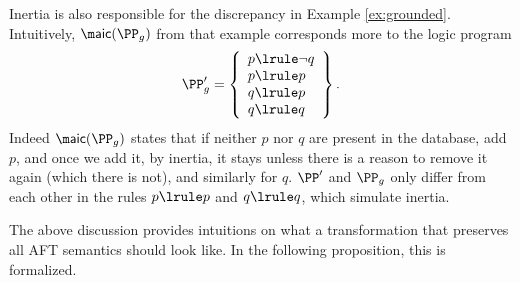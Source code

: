  Inertia is also responsible for the discrepancy in Example \ref{ex:grounded}. 
 Intuitively, $\aicop(\PP_g)$ from that example corresponds more to the logic program
  \[\PP_g' = \left\{\begin{array}{l}p\lrule \lnot q \\ p\lrule p \\ q\lrule p\\ q\lrule q  \end{array}\right\}.\]
  Indeed $\aicop(\PP_g)$ states that if neither  $p$ nor $q$ are present in the database, add $p$, and once we add it, by inertia, it stays unless there is a reason to remove it again (which there is not), and similarly for $q$. 
  $\PP'$ and $\PP_g$ only differ from each other in the rules $p\lrule p$ and $q\lrule q$, which simulate inertia.
 
 
 The above discussion provides intuitions on what a transformation that preserves all AFT semantics should look like. In the following proposition, this is formalized. 

  


